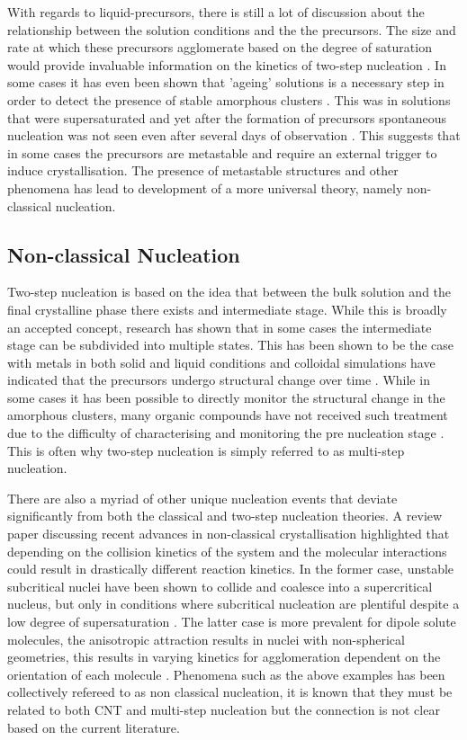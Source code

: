 With regards to liquid-precursors, there is still a lot of
discussion about the relationship between the solution 
conditions and the the precursors. The size and rate at 
which these precursors agglomerate based on the degree of 
saturation would provide invaluable information on the 
kinetics of two-step nucleation \cite{Fu2021}. In some 
cases it has even been shown that 'ageing' solutions is 
a necessary step in order to detect the presence of 
stable amorphous clusters \cite{Liao2022}. This was in 
solutions that were supersaturated and yet after the 
formation of precursors spontaneous nucleation was not
seen even after several days of observation \cite{Liao2022}.
This suggests that in some cases the precursors are
metastable and require an external trigger to induce
crystallisation. The presence of metastable structures
and other phenomena has lead to development of a more 
universal theory, namely non-classical nucleation.

\subsection{Non-classical Nucleation} 
Two-step nucleation is based on the idea that between
the bulk solution and the final crystalline phase there
exists and intermediate stage. While this is broadly an
accepted concept, research has shown that in some cases
the intermediate stage can be subdivided into multiple 
states. This has been shown to be the case with metals
in both solid and liquid conditions \cite{Cao2020, Ye2023}
and colloidal simulations have indicated that the 
precursors undergo structural change over time \cite{Tan2013}. 
While in some cases it has been possible to directly
monitor the structural change in the amorphous clusters, 
many organic compounds have not received such treatment
due to the difficulty of characterising and monitoring 
the pre nucleation stage \cite{Fu2021}. This is often 
why two-step nucleation is simply referred to as 
multi-step nucleation. 

There are also a myriad of other unique nucleation events
that deviate significantly from both the classical and 
two-step nucleation theories. A review paper discussing
recent advances in non-classical crystallisation highlighted
that depending on the collision kinetics of the system 
and the molecular interactions could result in drastically
different reaction kinetics. In the former case, unstable
subcritical nuclei have been shown to collide and coalesce
into a supercritical nucleus, but only in conditions where 
subcritical nucleation are plentiful despite a low degree
of supersaturation \cite{Baumgartner2013}. The latter case 
is more prevalent for dipole solute molecules, the anisotropic 
attraction results in nuclei with non-spherical geometries, 
this results in varying kinetics for agglomeration dependent 
on the orientation of each molecule \cite{Yau2001}. Phenomena 
such as the above examples has been collectively refereed to 
as non classical nucleation, it is known that they must be 
related to both CNT and multi-step nucleation but the connection 
is not clear based on the current literature.  

